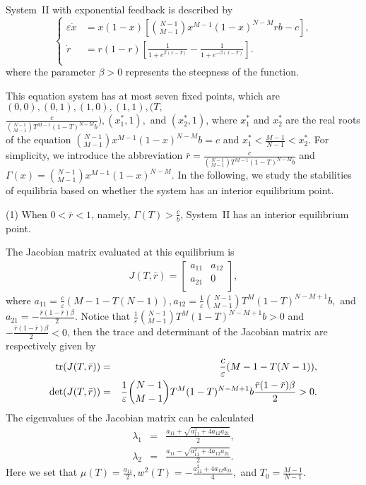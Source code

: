 \documentclass[9pt]{elife}
\begin{document}
\begin{appendixbox}\label{appendix2}

System~II with exponential feedback is described by
\begin{equation*}
\left\{
\begin{aligned}
\varepsilon\dot{x}&=x(1-x)[\binom{N-1}{M-1}x^{M-1}(1-x)^{N-M}rb-c],\\
\dot{r}&=r(1-r)[\frac{1}{1+e^{\beta (x-T)}}-\frac{1}{1+e^{-\beta (x-T)}}].\\
\end{aligned}
\right.
\end{equation*}
where the parameter $\beta>0$ represents the steepness of the function.

This equation system has at most seven fixed points, which are $(0, 0), (0, 1), (1, 0), (1, 1), (T, $\\$\frac{c}{\binom{N-1}{M-1}T^{M-1}(1-T)^{N-M}b}), (x_{1}^{*},1),$ and $(x_{2}^{*},1)$, where $x_{1}^{*}$ and $x_{2}^{*}$ are the real roots of the equation $\binom{N-1}{M-1}x^{M-1}(1-x)^{N-M}b=c$ and $x_{1}^{*}<\frac{M-1}{N-1}<x_{2}^{*}$. For simplicity, we introduce the abbreviation $\bar{r}=\frac{c}{\binom{N-1}{M-1}T^{M-1}(1-T)^{N-M}b}$ and $\Gamma(x)=\binom{N-1}{M-1}x^{M-1}(1-x)^{N-M}$. In the following, we study the stabilities of equilibria based on whether the system has an interior equilibrium point.

(1) When $0<\bar{r}<1$, namely, $\Gamma(T)>\frac{c}{b}$, System~II has an interior equilibrium point.

The Jacobian matrix evaluated at this equilibrium is
\begin{eqnarray*}
J(T, \bar{r}) =
  \left[ {\begin{array}{cc}
    a_{11} &  a_{12}\\
    a_{21} & 0 \\
  \end{array} } \right],
\end{eqnarray*}
where $a_{11}=\frac{c}{\varepsilon}(M-1-T(N-1)), a_{12}=\frac{1}{\varepsilon}\binom{N-1}{M-1}T^{M}(1-T)^{N-M+1}b,$ and $a_{21}=-\frac{\bar{r}(1-\bar{r})\beta}{2}$. Notice that $\frac{1}{\varepsilon}\binom{N-1}{M-1}T^{M}(1-T)^{N-M+1}b>0$ and $-\frac{\bar{r}(1-\bar{r})\beta}{2}<0$, then the trace and determinant of the Jacobian matrix are respectively given by
\begin{eqnarray*}
{\rm tr}(J(T, \bar{r}))&=&\frac{c}{\varepsilon}(M-1-T(N-1)),\\
{\rm det} (J(T, \bar{r}))&=&\frac{1}{\varepsilon}\binom{N-1}{M-1}T^{M}(1-T)^{N-M+1}b\frac{\bar{r}(1-\bar{r})\beta}{2}>0.
\end{eqnarray*}
The eigenvalues of the Jacobian matrix can be calculated
\begin{eqnarray*}
\lambda_{1}&=&\frac{a_{11}+\sqrt{a_{11}^{2}+4a_{12}a_{21}}}{2},\\
\lambda_{2}&=&\frac{a_{11}-\sqrt{a_{11}^{2}+4a_{12}a_{21}}}{2}.
\end{eqnarray*}
Here we set that $\mu(T)=\frac{a_{11}}{2}, w^{2}(T)=-\frac{a_{11}^{2}+4a_{12}a_{21}}{4},$ and $T_{0}=\frac{M-1}{N-1}.$\\


\end{appendixbox}
\end{document}
